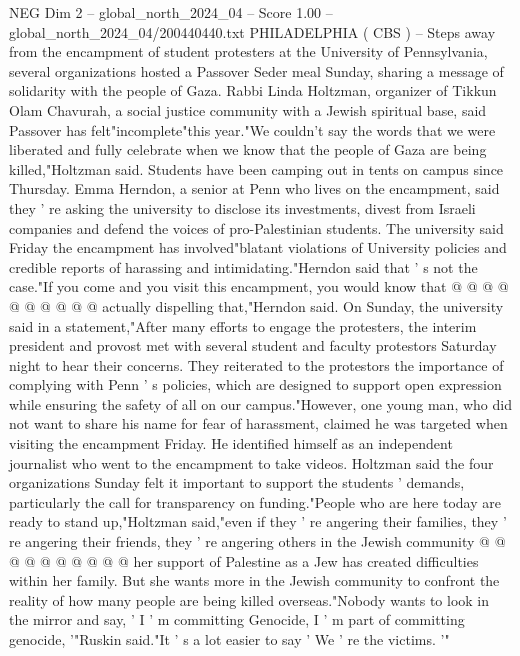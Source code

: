 \begin{textsample}{NEG Dim 2 – global\_north\_2024\_04 – Score 1.00 – global\_north\_2024\_04/200440440.txt}  \label{ex:f2_neg_274}
PHILADELPHIA ( CBS ) -- Steps away from the encampment of student protesters at the University of Pennsylvania, several organizations hosted a Passover Seder meal Sunday, sharing a message of solidarity with the people of Gaza.
Rabbi Linda Holtzman, organizer of Tikkun Olam Chavurah, a social justice community with a Jewish spiritual base, said Passover has felt"incomplete"this year."We couldn't say the words that we were liberated and fully celebrate when we know that the people of Gaza are being killed,"Holtzman said.
Students have been camping out in tents on campus since Thursday.
Emma Herndon, a senior at Penn who lives on the encampment, said they ' re asking the university to disclose its investments, divest from Israeli companies and defend the voices of pro-Palestinian students.
The university said Friday the encampment has involved"blatant violations of University policies and credible reports of harassing and intimidating."Herndon said that ' s not the case."If you come and you visit this encampment, you would know that @ @ @ @ @ @ @ @ @ @ actually dispelling that,"Herndon said.
On Sunday, the university said in a statement,"After many efforts to engage the protesters, the interim president and provost met with several student and faculty protestors Saturday night to hear their concerns.
They reiterated to the protestors the importance of complying with Penn ' s policies, which are designed to support open expression while ensuring the safety of all on our campus."However, one young man, who did not want to share his name for fear of harassment, claimed he was targeted when visiting the encampment Friday.
He identified himself as an independent journalist who went to the encampment to take videos.
Holtzman said the four organizations Sunday felt it important to support the students ' demands, particularly the call for transparency on funding."People who are here today are ready to stand up,"Holtzman said,"even if they ' re angering their families, they ' re angering their friends, they ' re angering others in the Jewish community @ @ @ @ @ @ @ @ @ @ her support of Palestine as a Jew has created difficulties within her family.
But she wants more in the Jewish community to confront the reality of how many people are being killed overseas."Nobody wants to look in the mirror and say, ' I ' m committing Genocide, I ' m part of committing genocide, '"Ruskin said."It ' s a lot easier to say ' We ' re the victims. '"

\end{textsample}
